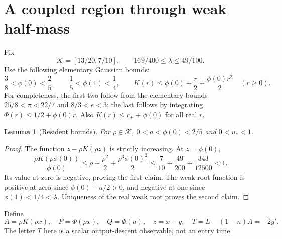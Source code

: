 \documentclass[11pt]{article}
\numberwithin{equation}{section}
\newtheorem{lemma}[theorem]{Lemma}
\theoremstyle{remark}\newtheorem{remark}[theorem]{Remark}
\newcommand{\1}{\mathbf 1}
\begin{document}
\section{A coupled region through weak half-mass}
\label{inc:AN06:v2:halfregion}
Fix
\begin{equation}\label{inc:AN06:v2:rhointerval}
 \mathcal K=[13/20,7/10],\qquad
 169/400\le\lambda\le49/100.
\end{equation}
Use the following elementary Gaussian bounds:
\begin{equation}\label{inc:AN06:v2:gaussianbounds}
 \frac38<\phi(0)<\frac25,\qquad
 \frac15<\phi(1)<\frac14,\qquad
 K(r)\le\phi(0)+\frac r2+\frac{\phi(0)r^2}{2}\quad(r\ge0).
\end{equation}
For completeness, the first two follow from the elementary bounds
$25/8<\pi<22/7$ and $8/3<e<3$; the last follows by integrating
$\Phi(r)\le1/2+\phi(0)r$. Also $K(r)\le r_++\phi(0)$ for all real $r$.

\begin{lemma}[Resident bounds]\label{inc:AN06:v2:residentbounds}
For $\rho\in\mathcal K$, $0<a<\phi(0)<2/5$ and $0<u_*<1$.
\end{lemma}
\begin{proof}
The function $z-\rho K(\rho z)$ is strictly increasing. At $z=\phi(0)$,
\[
 \frac{\rho K(\rho\phi(0))}{\phi(0)}
 \le\rho+\frac{\rho^2}{2}+\frac{\rho^3\phi(0)^2}{2}
 \le\frac7{10}+\frac{49}{200}+\frac{343}{12500}<1.
\]
Its value at zero is negative, proving the first claim. The weak-root
function is positive at zero since $\phi(0)-a/2>0$, and negative at one
since $\phi(1)<1/4<\lambda$. Uniqueness of the real weak root proves the
second claim.
\end{proof}

Define
\begin{equation}\label{inc:AN06:v2:TZ}
 A=\rho K(\rho x),\quad P=\Phi(\rho x),\quad Q=\Phi(u),\quad
 z=x-y,\quad T=L-(1-n)A=-2y'.
\end{equation}
The letter $T$ here is a scalar output-descent observable, not an entry time.
\end{document}
